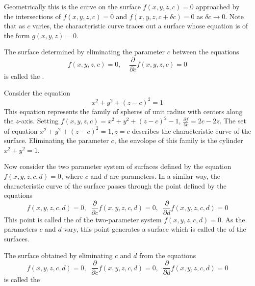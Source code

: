 \documentclass[12pt, a4paper, oneside, openright, titlepage]{book}
\begin{document}
\begin{appendices}
    Geometrically this is the curve on the surface $f(x,y,z,c) = 0$ approached by the intersections of $f(x,y,z,c) = 0$ and $f(x,y,z,c+\delta c) = 0$ as $\delta c \rightarrow 0$. Note that as $c$ varies, the characteristic curve traces out a surface whose equation is of the form $g(x,y,z) = 0$.

    \begin{defn}
        The surface determined by eliminating the parameter $c$ between the equations  \begin{equation*}
            f(x,y,z,c) = 0,\;\;\;\;\frac{\partial}{\partial c}f(x,y,z,c) = 0
        \end{equation*}
        is called the .
    \end{defn}

    \begin{eg}
        Consider the equation $$x^2+y^2+(z-c)^2 = 1$$ This equation represents the family of spheres of unit radius with centers along the $z$-axis. Setting $f(x,y,z,c) = x^2+y^2+(z-c)^2-1$, $\frac{\partial f}{\partial c} = 2c-2z$. The set of equation $x^2+y^2+(z-c)^2=1, z =c$ describes the characteristic curve of the surface. Eliminating the parameter $c$, the envolope of this family is the cylinder $x^2+y^2=1$.
    \end{eg}

    Now consider the two parameter system of surfaces defined by the equation $f(x,y,z,c,d) = 0$, where $c$ and $d$ are parameters. In a similar way, the characteristic curve of the surface passes through the point defined by the equations \begin{equation*}
        f(x,y,z,c,d) = 0,\;\;\frac{\partial }{\partial c}f(x,y,z,c,d) = 0,\;\;\frac{\partial }{\partial d}f(x,y,z,c,d) = 0
    \end{equation*}
    This point is called the  of the two-parameter system $f(x,y,z,c,d) = 0$. As the parameters $c$ and $d$ vary, this point generates a surface which is called the  of the surfaces.

    \begin{defn}
        The surface obtained by eliminating $c$ and $d$ from the equations \begin{equation*}
        f(x,y,z,c,d) = 0,\;\;\frac{\partial }{\partial c}f(x,y,z,c,d) = 0,\;\;\frac{\partial }{\partial d}f(x,y,z,c,d) = 0
    \end{equation*}
        is called the 
    \end{defn}


\end{appendices}
\end{document}
